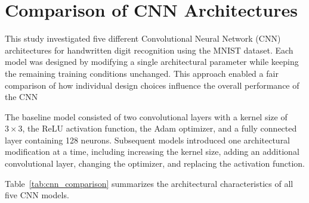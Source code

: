 
\section{Comparison of CNN Architectures}

This study investigated five different Convolutional Neural Network (CNN) architectures for handwritten digit recognition using the MNIST dataset. Each model was designed by modifying a single architectural parameter while keeping the remaining training conditions unchanged. This approach enabled a fair comparison of how individual design choices influence the overall performance of the CNN

The baseline model consisted of two convolutional layers with a kernel size of $3\times3$, the ReLU activation function, the Adam optimizer, and a fully connected layer containing 128 neurons. Subsequent models introduced one architectural modification at a time, including increasing the kernel size, adding an additional convolutional layer, changing the optimizer, and replacing the activation function.

Table~\ref{tab:cnn_comparison} summarizes the architectural characteristics of all five CNN models.

\begin{table}[H]
\centering
\caption{Comparison of CNN Architectures}\label{tab:cnn_comparison}

\end{table}

